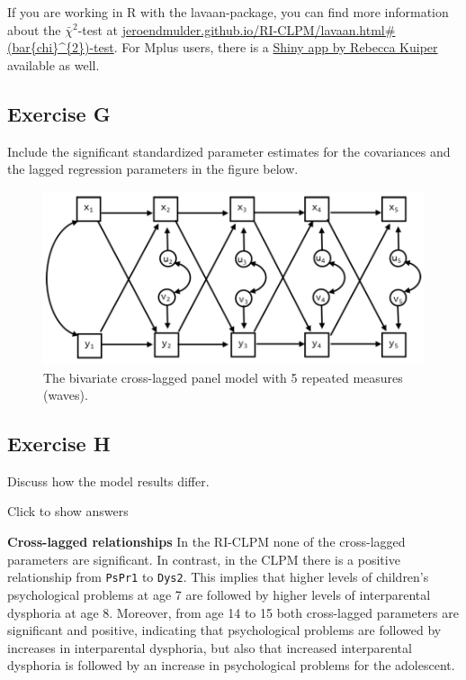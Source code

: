 \documentclass[
]{book}
\begin{document}
If you are working in R with the lavaan-package, you can find more information about the \(\bar{\chi}^{2}\)-test at \href{https://jeroendmulder.github.io/RI-CLPM/lavaan.html\#(bar\%7Bchi\%7D\%5E\%7B2\%7D)-test}{jeroendmulder.github.io/RI-CLPM/lavaan.html\#(bar\{chi\}\^{}\{2\})-test}. For Mplus users, there is a \href{https://www.uu.nl/staff/RMKuiper/Websites\%20\%2F\%20Shiny\%20apps}{Shiny app by Rebecca Kuiper} available as well.

\hypertarget{exercise-g-1}{%
\subsection{Exercise G}\label{exercise-g-1}}

Include the significant standardized parameter estimates for the covariances and the lagged regression parameters in the figure below.

\begin{figure}
\centering
\includegraphics[width=5.20833in,height=\textheight]{CLPM-5waves.png}
\caption{The bivariate cross-lagged panel model with 5 repeated measures (waves).}
\end{figure}

\hypertarget{exercise-h-1}{%
\subsection{Exercise H}\label{exercise-h-1}}

Discuss how the model results differ.

Click to show answers

\textbf{Cross-lagged relationships}
In the RI-CLPM none of the cross-lagged parameters are significant. In contrast, in the CLPM there is a positive relationship from \texttt{PsPr1} to \texttt{Dys2}. This implies that higher levels of children's psychological problems at age 7 are followed by higher levels of interparental dysphoria at age 8. Moreover, from age 14 to 15 both cross-lagged parameters are significant and positive, indicating that psychological problems are followed by increases in interparental dysphoria, but also that increased interparental dysphoria is followed by an increase in psychological problems for the adolescent.
\end{document}
